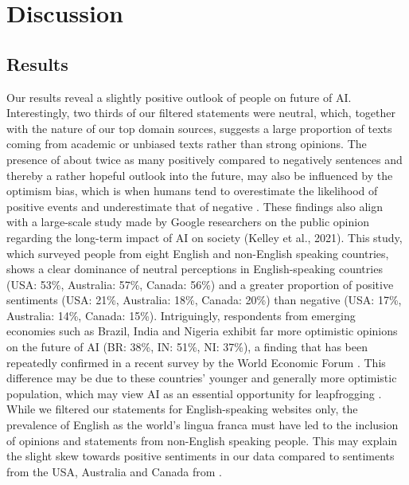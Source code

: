 \section{Discussion}

\subsection{Results}
Our results reveal a slightly positive outlook of people on future of AI.
Interestingly, two thirds of our filtered statements were neutral, which, together with the nature of our top domain sources, suggests a large proportion of texts coming from academic or unbiased texts rather than strong opinions.
The presence of about twice as many positively compared to negatively sentences and thereby a rather hopeful outlook into the future, may also be influenced by the optimism bias, which is when humans tend to overestimate the likelihood of positive events and underestimate that of negative \citep{sharot2011optimism}.
These findings also align with a large-scale study made by Google researchers on the public opinion regarding the long-term impact of AI on society (Kelley et al., 2021).
This study, which surveyed people from eight English and non-English speaking countries, shows a clear dominance of neutral perceptions in English-speaking countries (USA: 53\%, Australia: 57\%, Canada: 56\%) and a greater proportion of positive sentiments (USA: 21\%, Australia: 18\%, Canada: 20\%) than negative (USA: 17\%, Australia: 14\%, Canada: 15\%).
Intriguingly, respondents from emerging economies such as Brazil, India and Nigeria exhibit far more optimistic opinions on the future of AI (BR: 38\%, IN: 51\%, NI: 37\%), a finding that has been repeatedly confirmed in a recent survey by the World Economic Forum \citep{Markovitz2022}.
This difference may be due to these countries’ younger and generally more optimistic population, which may view AI as an essential opportunity for leapfrogging \citep{zhenmin2019frontier}.
While we filtered our statements for English-speaking websites only, the prevalence of English as the world’s lingua franca must have led to the inclusion of opinions and statements from non-English speaking people.
This may explain the slight skew towards positive sentiments in our data compared to sentiments from the USA, Australia and Canada from \citet{kelley2021exciting}.
